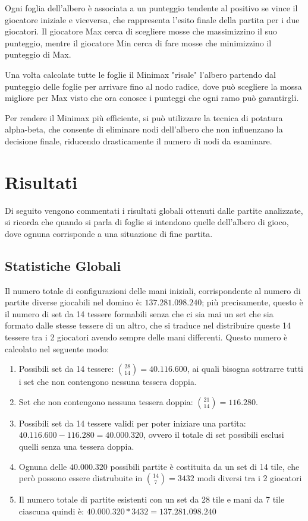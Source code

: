 \documentclass[a4paper,12pt]{report} %
\begin{document}
Ogni foglia dell’albero è associata a un punteggio tendente al positivo se vince il giocatore iniziale e viceversa, che rappresenta l’esito finale della partita per i due giocatori. Il giocatore Max cerca di scegliere mosse che massimizzino il suo punteggio, mentre il giocatore Min cerca di fare mosse che minimizzino il punteggio di Max. 

Una volta calcolate tutte le foglie il Minimax "risale" l'albero partendo dal punteggio delle foglie per arrivare fino al nodo radice, dove può scegliere la mossa migliore per Max visto che ora conosce i punteggi che ogni ramo può garantirgli.

Per rendere il Minimax più efficiente, si può utilizzare la tecnica di potatura alpha-beta, che consente di eliminare nodi dell’albero che non influenzano la decisione finale, riducendo drasticamente il numero di nodi da esaminare. 

\chapter{Risultati}

Di seguito vengono commentati i risultati globali ottenuti dalle partite analizzate, si ricorda che quando si parla di foglie si intendono quelle dell'albero di gioco, dove ognuna corrisponde a una situazione di fine partita. 

\section{Statistiche Globali}

Il numero totale di configurazioni delle mani iniziali, corrispondente al numero di partite diverse giocabili nel domino è: \(137.281.098.240\); più precisamente, questo è il numero di set da 14 tessere formabili senza che ci sia mai un set che sia formato dalle stesse tessere di un altro, che si traduce nel distribuire queste 14 tessere tra i 2 giocatori avendo sempre delle mani differenti.
Questo numero è calcolato nel seguente modo:


\begin{enumerate}
    \item Possibili set da 14 tessere: \(\binom{28}{14} = 40.116.600\), ai quali bisogna sottrarre tutti i set che non contengono nessuna tessera doppia.
    \item Set che non contengono nessuna tessera doppia: \(\binom{21}{14} = 116.280\).
    \item Possibili set da 14 tessere validi per poter iniziare una partita: \(40.116.600 - 116.280 = 40.000.320\), ovvero il totale di set possibili esclusi quelli senza una tessera doppia.
    \item Ognuna delle \(40.000.320\) possibili partite è costituita da un set di 14 tile, che però possono essere distrubuite in \(\binom{14}{7} = 3432\) modi diversi tra i 2 giocatori
    \item Il numero totale di partite esistenti con un set da 28 tile e mani da 7 tile ciascuna quindi è: \(40.000.320 * 3432 = 137.281.098.240\)
\end{enumerate}
\end{document}
